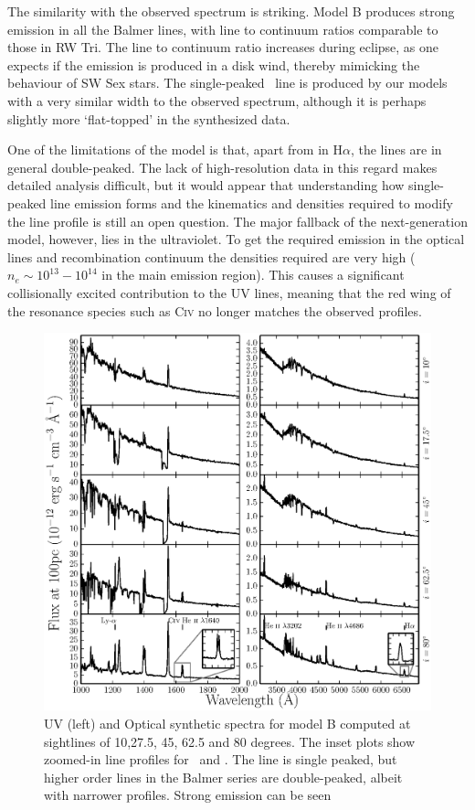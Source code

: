 \documentclass[preprint, a4paper, 11pt]{aastex}
\begin{document}
The similarity with the observed spectrum is striking. 
Model B produces strong emission in all the Balmer lines, 
with line to continuum ratios
comparable to those in RW Tri. 
The line to continuum ratio increases during eclipse,
as one expects if the emission is produced in a disk wind, 
thereby mimicking the behaviour of SW Sex stars.
The single-peaked \ha\ line is produced by our models with a 
very similar width to the observed spectrum, although it is perhaps slightly more
`flat-topped' in the synthesized data.

One of the limitations of the model is that, apart 
from in H$\alpha$, the lines are in general double-peaked. 
The lack of high-resolution data in this regard makes detailed analysis difficult,
but it would appear that understanding how single-peaked 
line emission forms and the kinematics and densities required to
modify the line profile is still an open question. 
The major fallback of the next-generation model, however, lies
in the ultraviolet. To get the required emission in the optical lines
and recombination continuum the densities required are very high 
($n_e\sim10^{13}-10^{14}$ in the main emission region).
This causes a significant collisionally excited contribution
to the UV lines, meaning that the red wing of the 
resonance species such as C\textsc{iv} no longer matches the
observed profiles. 




\begin{figure} %
\includegraphics[width=\textwidth]{figures/fig14_uv_opt.eps}
\caption{
UV (left) and Optical synthetic spectra for model B computed at
sightlines of 10,27.5, 45, 62.5 and 80 degrees.	
The inset plots show zoomed-in line profiles for 
\heiiuv \ and \ha. The \ha line 
is single peaked, but higher order lines in the Balmer series
are double-peaked, albeit with narrower profiles.
Strong \heiiopt emission can be seen
}
\label{uvoptb}
\end{figure} %
\end{document}

